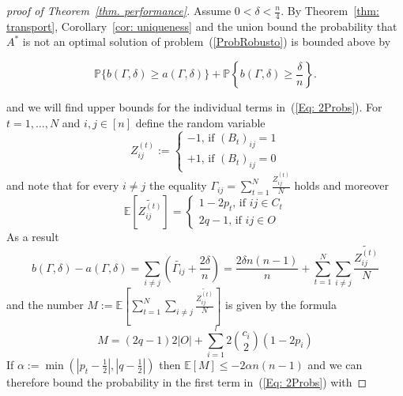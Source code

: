 \documentclass[12pt]{amsart}
\theoremstyle{remark}
\newcommand{\PP}{\mathbb{P}}
\newcommand{\EE}{\mathbb{E}}
\begin{document}
\begin{proof} [proof of Theorem~\ref{thm. performance}]Assume $0<\delta< \frac{n}{4}$. By Theorem~\ref{thm: transport}, Corollary~\ref{cor: uniqueness} and the union bound the probability that $A^*$ is not an optimal solution of problem~(\ref{ProbRobusto}) is bounded above by

\begin{equation}\label{Eq: 2Probs}
\PP\{b(\Gamma,\delta)\geq a(\Gamma,\delta)\}+\PP\left\{b(\Gamma,\delta)\geq \frac{\delta}{n}\right\}.
\end{equation}

and we will find upper bounds for the individual terms in~(\ref{Eq: 2Probs}). 
For $t=1,\dots, N$ and $i,j\in [n]$ define the random variable
\[Z^{(t)}_{ij}:=\begin{cases}
-1\text{, if $(B_t)_{ij}=1$}\\
+1\text{, if $(B_t)_{ij}=0$}
\end{cases}\]
and note that for every $i\neq j$ the equality $\Gamma_{ij} = \sum_{t=1}^N\frac{Z_{ij}^{(t)}}{N}$ holds and moreover
\[
\EE[\widetilde{Z^{(t)}_{ij}}]=\begin{cases}
1-2p_t\text{, if $ij\in C_t$}\\
2q-1\text{, if $ij\in O$}
\end{cases}
\]
As a result
\[b(\Gamma,\delta)-a(\Gamma,\delta) = \sum_{i\neq j} \left(\widetilde{\Gamma_{ij}}+\frac{2\delta}{n}\right)= \frac{2\delta n(n-1)}{n} + \sum_{t=1}^N \sum_{i\neq j} \frac{\widetilde{Z^{(t)}_{ij}}}{N}\]
and the number $M:=\EE\left[\sum_{t=1}^N \sum_{i\neq j} \frac{\widetilde{Z^{(t)}_{ij}}}{N}\right]$ is given by the formula
\[M=(2q-1)2|O|+\sum_{i=1}^l 2\binom{c_i}{2} (1-2p_i)\]
If $\alpha := \min (|p_t-\frac{1}{2}|, |q-\frac{1}{2}|)$ then $\EE[M]\leq -2\alpha n(n-1)$ 
and we can therefore bound the probability in the first term in~(\ref{Eq: 2Probs}) with
 

\end{proof}
\end{document}
